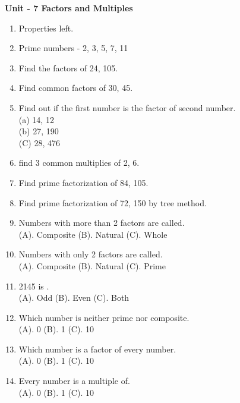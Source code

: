 \centerline{\textbf{ \LARGE  Unit - 7 \quad Factors and Multiples }}

\begin{enumerate}

    \item Properties left.

    \item Prime numbers - 2, 3, 5, 7, 11

    \item Find the factors of 24, 105.

    \item Find common factors of 30, 45.

    \item Find out if the first number is the factor of second number.
            \\(a) 14, 12 \\(b) 27, 190 \\(C) 28, 476

    \item find 3 common multiplies of 2, 6.

    \item Find prime factorization of 84, 105.

    \item Find prime factorization of 72, 150  by tree method.

    \item Numbers with more than 2 factors are called.
          \\ (A). Composite \qquad (B). Natural \qquad (C). Whole

    \item Numbers with only 2 factors are called.
          \\ (A). Composite \qquad (B). Natural \qquad (C). Prime

    \item 2145 is .
          \\ (A). Odd \qquad (B). Even \qquad (C). Both

    \item Which number is neither prime nor composite.
        \\ (A). 0 \qquad (B). 1 \qquad (C). 10

    \item Which number is a  factor of every number.
        \\ (A). 0 \qquad (B). 1 \qquad (C). 10

    \item Every number is a  multiple of.
        \\ (A). 0 \qquad (B). 1 \qquad (C). 10



\end{enumerate}
